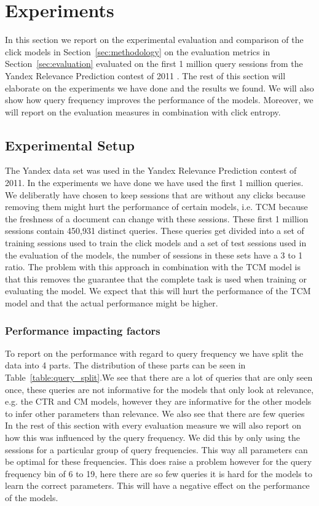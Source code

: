 \section{Experiments}
\label{sec:experiments}
In this section we report on the experimental evaluation and comparison of the click models in Section~\ref{sec:methodology} on the evaluation metrics in Section~\ref{sec:evaluation} evaluated on the first 1 million query sessions from the Yandex Relevance Prediction contest of 2011 \cite{YandexData}. The rest of this section will elaborate on the experiments we have done and the results we found. We will also show how query frequency improves the performance of the models. Moreover, we will report on the evaluation measures in combination with click entropy.

\subsection{Experimental Setup}
The Yandex data set was used in the Yandex Relevance Prediction contest of 2011. In the experiments we have done we have used the first 1 million queries. We deliberatly have chosen to keep sessions that are without any clicks because removing them might hurt the performance of certain models, i.e. TCM because the freshness of a document can change with these sessions. These first 1 million sessions contain 450,931 distinct queries. These queries get divided into a set of training sessions used to train the click models and a set of test sessions used in the evaluation of the models, the number of sessions in these sets have a 3 to 1 ratio. The problem with this approach in combination with the TCM model is that this removes the guarantee that the complete task is used when training or evaluating the model. We expect that this will hurt the performance of the TCM model and that the actual performance might be higher. 

\subsubsection{Performance impacting factors}
To report on the performance with regard to query frequency we have split the data into 4 parts. The distribution of these parts can be seen in Table~\ref{table:query_split}.We see that there are a lot of queries that are only seen once, these queries are not informative for the models that only look at relevance, e.g. the CTR and CM models, however they are informative for the other models to infer other parameters than relevance. We also see that there are few queries In the rest of this section with every evaluation measure we will also report on how this was influenced by the query frequency. We did this by only using the sessions for a particular group of query frequencies. This way all parameters can be optimal for these frequencies. This does raise a problem however for the query frequency bin of 6 to 19, here there are so few queries it is hard for the models to learn the correct parameters. This will have a negative effect on the performance of the models. 

